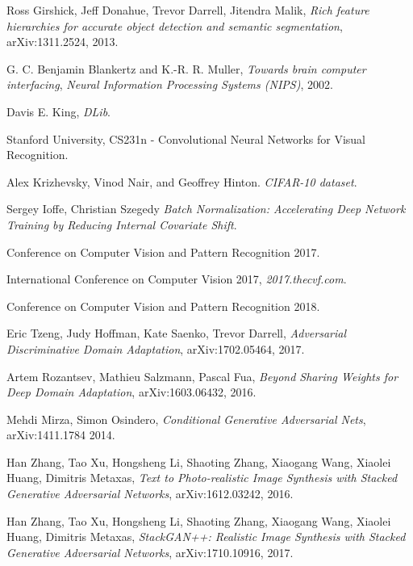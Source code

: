 \begin{thebibliography}{}
	Ross Girshick, Jeff Donahue, Trevor Darrell, Jitendra Malik,
    \emph{Rich feature hierarchies for accurate object detection and semantic segmentation},
	arXiv:1311.2524, 2013.

	G. C. Benjamin Blankertz and K.-R. R. Muller,
    \emph{Towards brain computer interfacing},
	\emph{Neural Information Processing Systems (NIPS)},
	2002.


	Davis E. King,
    \emph{DLib}.



	Stanford University,
	CS231n - Convolutional Neural Networks for Visual Recognition.

    Alex Krizhevsky, Vinod Nair, and Geoffrey Hinton.
	\emph{CIFAR-10 dataset}.



    Sergey Ioffe, Christian Szegedy
    \emph{Batch Normalization: Accelerating Deep Network Training by Reducing Internal Covariate Shift}.


	Conference on Computer Vision and Pattern Recognition 2017.

	International Conference on Computer Vision 2017,
    \emph{2017.thecvf.com}.

	Conference on Computer Vision and Pattern Recognition 2018.

    Eric Tzeng, Judy Hoffman, Kate Saenko, Trevor Darrell,
    \emph{Adversarial Discriminative Domain Adaptation},
    arXiv:1702.05464, 2017.

    Artem Rozantsev, Mathieu Salzmann, Pascal Fua,
    \emph{Beyond Sharing Weights for Deep Domain Adaptation},
    arXiv:1603.06432, 2016.

    Mehdi Mirza, Simon Osindero,
    \emph{Conditional Generative Adversarial Nets},
    arXiv:1411.1784 2014.

    Han Zhang, Tao Xu, Hongsheng Li, Shaoting Zhang, Xiaogang Wang, Xiaolei Huang, Dimitris Metaxas,
    \emph{Text to Photo-realistic Image Synthesis with Stacked Generative Adversarial Networks},
    arXiv:1612.03242, 2016.

    Han Zhang, Tao Xu, Hongsheng Li, Shaoting Zhang, Xiaogang Wang, Xiaolei Huang, Dimitris Metaxas,
    \emph{StackGAN++: Realistic Image Synthesis with Stacked Generative Adversarial Networks},
    arXiv:1710.10916, 2017.
    


\end{thebibliography}
